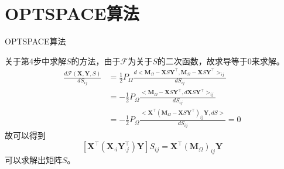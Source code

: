 \section{OPTSPACE算法}
\begin{algorithm}
\caption{OPTSPACE算法} 
\label{alg4}
\begin{algorithmic}[1]
\ENDWHILE
{}
\ENDIF
\ENDFOR
{}
\end{algorithmic}
\end{algorithm}

关于第4步中求解$S$的方法，由于$\mathcal{F}$为关于$S$的二次函数，故求导等于0来求解。
\begin{equation*}
\begin{split}
    \frac{d\mathcal{F}(\mathbf{X,Y},S)}{dS_{ij}} &= \frac{1}{2}P_\Omega\frac{d<\mathbf{M}_\Omega - \mathbf{X}S\mathbf{Y}^\intercal, \mathbf{M}_\Omega - \mathbf{X}S\mathbf{Y}^\intercal>_{ij}}{dS_{ij}}\\
    &=-\frac{1}{2}P_\Omega\frac{<\mathbf{M}_\Omega - \mathbf{X}S\mathbf{Y}^\intercal, d\mathbf{X}S\mathbf{Y}^\intercal>_{ij}}{dS_{ij}}\\
    &=-\frac{1}{2}P_\Omega\frac{<\mathbf{X}^\intercal(\mathbf{M}_\Omega - \mathbf{X}S\mathbf{Y}^\intercal)_{ij}\mathbf{Y}, dS>}{dS_{ij}} = 0
\end{split}
\end{equation*}
故可以得到
\begin{equation*}
    \left[\mathbf{X}^\intercal(\mathbf{X}_{\cdot i}\mathbf{Y}_{\cdot j}^\intercal)\mathbf{Y}\right]S_{ij} = \mathbf{X}^\intercal(\mathbf{M}_\Omega)_{ij}\mathbf{Y}
\end{equation*}
可以求解出矩阵$S$。

